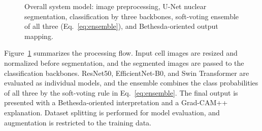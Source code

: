 \documentclass[conference]{IEEEtran}
\begin{document}
\begin{figure}[t]
\centering
{}
\caption{Overall system model: image preprocessing, U-Net nuclear segmentation, classification by three backbones, soft-voting ensemble of all three (Eq.~\ref{eq:ensemble}), and Bethesda-oriented output mapping.}
\label{fig:pipeline}
\end{figure}

Figure~\ref{fig:pipeline} summarizes the processing flow. Input cell images are resized and normalized before segmentation, and the segmented images are passed to the classification backbones. ResNet50, EfficientNet-B0, and Swin Transformer are evaluated as individual models, and the ensemble combines the class probabilities of all three by the soft-voting rule in Eq.~\ref{eq:ensemble}. The final output is presented with a Bethesda-oriented interpretation and a Grad-CAM++ explanation. Dataset splitting is performed for model evaluation, and augmentation is restricted to the training data.
\end{document}
